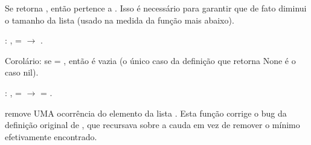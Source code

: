 Se   retorna  , então  pertence a . Isso é
    necessário para garantir que  de fato diminui o tamanho da
    lista (usado na medida da função  mais abaixo). 
\begin{coqdoccode}
\coqdocnoindent
{}  : \coqdockw{\ensuremath{\forall}}  ,   =   \ensuremath{\rightarrow}   .\coqdoceol
\coqdocemptyline
\end{coqdoccode}
Corolário: se   = , então  é vazia (o único caso da
    definição que retorna None é o caso nil). 
\begin{coqdoccode}
\coqdocnoindent
{}  : \coqdockw{\ensuremath{\forall}} ,   =  \ensuremath{\rightarrow}  = .\coqdoceol
\coqdocemptyline
\coqdocemptyline
\end{coqdoccode}
   remove UMA ocorrência do elemento  da lista .
    Esta função corrige o bug da definição original de , que recursava
    sobre a cauda  em vez de remover o mínimo efetivamente encontrado. 
